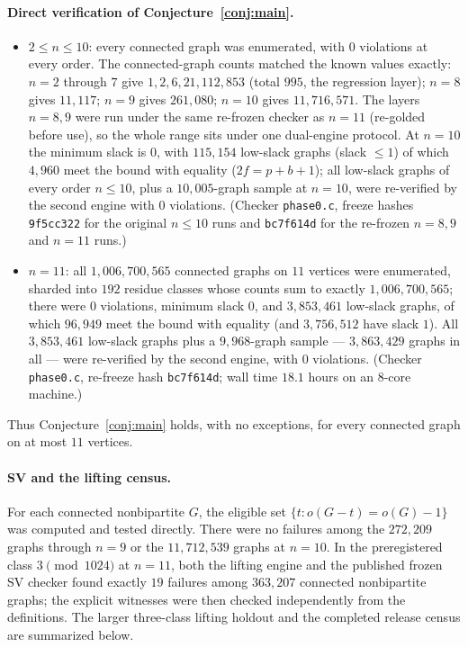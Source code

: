 \documentclass[11pt]{article}
\theoremstyle{plain}
\theoremstyle{definition}
\newcommand{\OCT}{o}
\begin{document}
\paragraph{Direct verification of Conjecture~\ref{conj:main}.}
\begin{itemize}
\item $2\le n\le10$: every connected graph was enumerated, with $0$ violations at
every order. The connected-graph counts matched the known values exactly: $n=2$
through $7$ give $1,2,6,21,112,853$ (total $995$, the regression layer); $n=8$
gives $11{,}117$; $n=9$ gives $261{,}080$; $n=10$ gives $11{,}716{,}571$. The
layers $n=8,9$ were run under the same re-frozen checker as $n=11$ (re-golded
before use), so the whole range sits under one dual-engine protocol. At $n=10$
the minimum slack is $0$, with $115{,}154$ low-slack graphs (slack $\le1$) of
which $4{,}960$ meet the bound with equality ($2f=p+b+1$); all low-slack graphs
of every order $n\le10$, plus a $10{,}005$-graph sample at $n=10$, were re-verified
by the second engine with $0$ violations. (Checker \texttt{phase0.c}, freeze
hashes \texttt{9f5cc322} for the original $n\le10$ runs and \texttt{bc7f614d} for
the re-frozen $n=8,9$ and $n=11$ runs.)
\item $n=11$: all $1{,}006{,}700{,}565$ connected graphs on $11$ vertices were
enumerated, sharded into $192$ residue classes whose counts sum to exactly
$1{,}006{,}700{,}565$; there were $0$ violations, minimum slack $0$, and
$3{,}853{,}461$ low-slack graphs, of which $96{,}949$ meet the bound with
equality (and $3{,}756{,}512$ have slack $1$). All $3{,}853{,}461$ low-slack
graphs plus a $9{,}968$-graph sample --- $3{,}863{,}429$ graphs in all --- were
re-verified by the second engine, with $0$ violations. (Checker
\texttt{phase0.c}, re-freeze hash \texttt{bc7f614d}; wall time $18.1$ hours on an
$8$-core machine.)
\end{itemize}
Thus Conjecture~\ref{conj:main} holds, with no exceptions, for every connected
graph on at most $11$ vertices.

\paragraph{SV and the lifting census.} For each connected nonbipartite $G$, the
eligible set $\{t:\OCT(G-t)=\OCT(G)-1\}$ was computed and tested directly.
There were no failures among the $272,209$ graphs through $n=9$ or the
$11,712,539$ graphs at $n=10$.  In the preregistered class
$3\pmod{1024}$ at $n=11$, both the lifting engine and the published frozen SV
checker found exactly $19$ failures among $363,207$ connected nonbipartite
graphs; the explicit witnesses were then checked independently from the
definitions.  The larger three-class lifting holdout and the completed release
census are summarized below.
\end{document}
